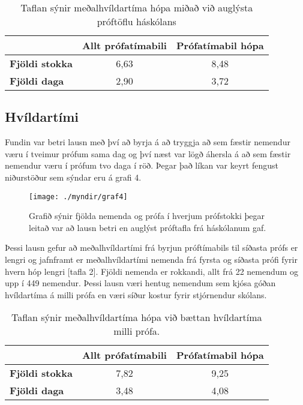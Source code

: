 \documentclass[12pt]{article}
\begin{document}
\bigskip
\begin{table}[h]
    \centering
    \begin{tabular}{l|c|c|}
        \cline{2-3}
        & \multicolumn{1}{l|}{\textbf{Allt prófatímabili}} & \multicolumn{1}{l|}{\textbf{Prófatímabil hópa}} \\ \hline
        \multicolumn{1}{|l|}{\textbf{Fjöldi stokka}} & 6,63                                             & 8,48                                            \\ \hline
        \multicolumn{1}{|l|}{\textbf{Fjöldi daga}}   & 2,90                                             & 3,72                                            \\ \hline
    \end{tabular}
    \caption{Taflan sýnir meðalhvíldartíma hópa miðað við auglýsta próftöflu háskólans}
\end{table}


\newpage
\subsection{Hvíldartími}

Fundin var betri lausn með því að byrja á að tryggja að sem fæstir nemendur væru í tveimur prófum sama dag og því næst var lögð áhersla á að sem fæstir nemendur væru í prófum tvo daga í röð. Þegar það líkan var keyrt fengust niðurstöður sem sýndar eru á grafi 4.


\begin{figure}[h]
    \centering
    \texttt{[image: ./myndir/graf4]}
    \caption{Grafið sýnir fjölda nemenda og prófa í hverjum prófstokki þegar leitað var að lausn betri en auglýst próftafla frá háskólanum gaf.}
\end{figure}

\newpage

Þessi lausn gefur að meðalhvíldartími frá byrjun próftímabils til síðasta prófs er lengri og jafnframt er meðalhvíldartími nemenda frá fyrsta og síðasta prófi fyrir hvern hóp lengri [tafla 2]. 
Fjöldi nemenda er rokkandi, allt frá 22 nemendum og upp í 449 nemendur. Þessi lausn væri hentug nemendum sem kjósa góðan hvíldartíma á milli prófa en væri síður kostur fyrir stjórnendur skólans.


\begin{table}[h]
    \centering
    \begin{tabular}{l|c|c|}
        \cline{2-3}
        & \multicolumn{1}{l|}{\textbf{Allt prófatímabili}} & \multicolumn{1}{l|}{\textbf{Prófatímabil hópa}} \\ \hline
        \multicolumn{1}{|l|}{\textbf{Fjöldi stokka}} & 7,82                                             & 9,25                                            \\ \hline
        \multicolumn{1}{|l|}{\textbf{Fjöldi daga}}   & 3,48                                             & 4,08                                            \\ \hline
    \end{tabular}
    \caption{Taflan sýnir meðalhvíldartíma hópa við bættan hvíldartíma milli prófa.}
\end{table}
\end{document}
